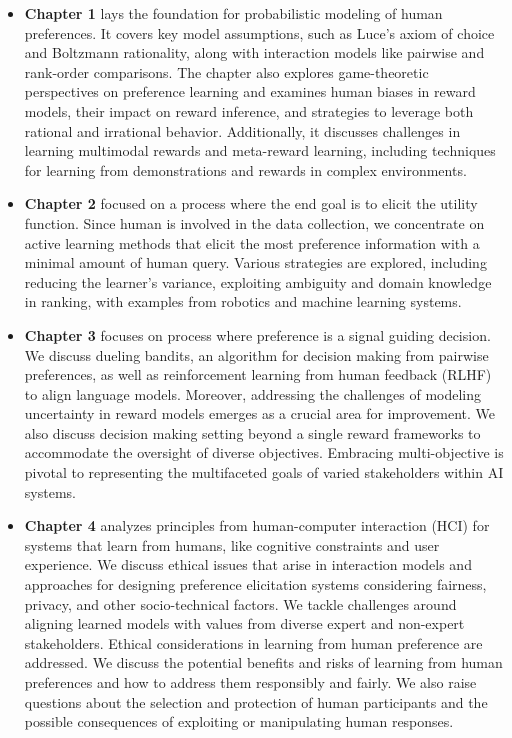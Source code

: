 \documentclass[
  letterpaper,
  numbers=noenddot,
  DIV=11]{scrreprt}
\theoremstyle{definition}
\theoremstyle{plain}
\theoremstyle{plain}
\theoremstyle{remark}
\begin{document}
\begin{itemize}
\item
  \textbf{Chapter 1} lays the foundation for probabilistic modeling of
  human preferences. It covers key model assumptions, such as Luce's
  axiom of choice and Boltzmann rationality, along with interaction
  models like pairwise and rank-order comparisons. The chapter also
  explores game-theoretic perspectives on preference learning and
  examines human biases in reward models, their impact on reward
  inference, and strategies to leverage both rational and irrational
  behavior. Additionally, it discusses challenges in learning multimodal
  rewards and meta-reward learning, including techniques for learning
  from demonstrations and rewards in complex environments.
\item
  \textbf{Chapter 2} focused on a process where the end goal is to
  elicit the utility function. Since human is involved in the data
  collection, we concentrate on active learning methods that elicit the
  most preference information with a minimal amount of human query.
  Various strategies are explored, including reducing the learner's
  variance, exploiting ambiguity and domain knowledge in ranking, with
  examples from robotics and machine learning systems.
\item
  \textbf{Chapter 3} focuses on process where preference is a signal
  guiding decision. We discuss dueling bandits, an algorithm for
  decision making from pairwise preferences, as well as reinforcement
  learning from human feedback (RLHF) to align language models.
  Moreover, addressing the challenges of modeling uncertainty in reward
  models emerges as a crucial area for improvement. We also discuss
  decision making setting beyond a single reward frameworks to
  accommodate the oversight of diverse objectives. Embracing
  multi-objective is pivotal to representing the multifaceted goals of
  varied stakeholders within AI systems.
\item
  \textbf{Chapter 4} analyzes principles from human-computer interaction
  (HCI) for systems that learn from humans, like cognitive constraints
  and user experience. We discuss ethical issues that arise in
  interaction models and approaches for designing preference elicitation
  systems considering fairness, privacy, and other socio-technical
  factors. We tackle challenges around aligning learned models with
  values from diverse expert and non-expert stakeholders. Ethical
  considerations in learning from human preference are addressed. We
  discuss the potential benefits and risks of learning from human
  preferences and how to address them responsibly and fairly. We also
  raise questions about the selection and protection of human
  participants and the possible consequences of exploiting or
  manipulating human responses.
\end{itemize}
\end{document}
